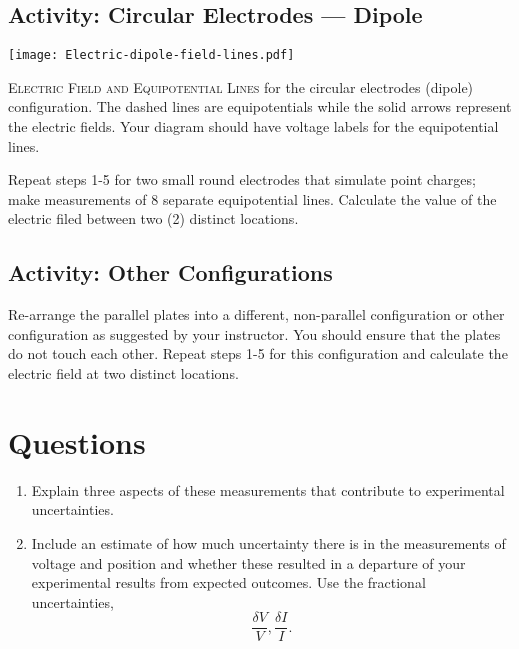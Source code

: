 \subsection{Activity: Circular Electrodes --- Dipole}
\begin{marginfigure}[-20em]
	\texttt{[image: Electric-dipole-field-lines.pdf]}
	\caption[Dipole Electric Field]{\textsc{Electric Field and Equipotential Lines} for the circular electrodes (dipole) configuration.  The dashed lines are equipotentials while the solid arrows represent the electric fields.  Your diagram should have voltage labels for the equipotential lines.}
\end{marginfigure}
Repeat steps 1-5 for two small round electrodes that simulate point charges; make measurements of 8 separate equipotential lines. Calculate the value of the electric filed between two (2) distinct locations.

\subsection{Activity: Other Configurations}
Re-arrange the parallel plates into a different, non-parallel configuration or other configuration as suggested by your instructor.  You should ensure that the plates do not touch each other.  Repeat steps 1-5 for this configuration and calculate the electric field at two distinct locations.

\section{Questions}
\begin{enumerate}
	 \item Explain three aspects of these measurements that contribute to experimental uncertainties.
	 \item Include an estimate of how much uncertainty  there is in the measurements of voltage and position and whether these resulted in a departure of your experimental results from expected outcomes. Use the fractional uncertainties, \[ \frac{\delta V}{V}, \frac{\delta I}{I}. \]
\end{enumerate}


\endinput

